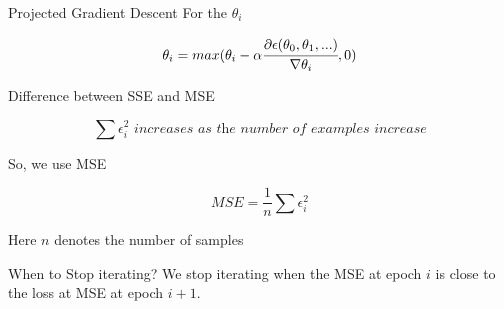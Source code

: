 \documentclass{beamer}
\begin{document}
	
	
	\begin{frame}{Projected Gradient Descent}
		For the $\theta_{i}$
		
		\begin{equation*}
		\theta_{i} = max(\theta_{i} - \alpha \cfrac{\partial \epsilon (\theta_{0},\theta_{1},...)}{ \nabla  \theta_{i}},0)
		\end{equation*}
	\end{frame}
	
	\begin{frame}{Difference between SSE and MSE}
		
		
		
		\begin{equation*}
		\sum \epsilon_{i}^{2} \textit{ increases as the number of examples increase}
		\end{equation*}
		
		So, we use MSE
		
		\begin{equation*}
		\textit{MSE} = \frac{1}{n} \sum \epsilon_{i}^{2}
		\end{equation*}
		
		Here $n$ denotes the number of samples
		
		
		
	\end{frame}
	
	\begin{frame}{When to Stop iterating?}
		We stop iterating when the MSE at epoch $i$ is close to the loss at MSE at epoch $i+1$.
	\end{frame}
	
\end{document}
